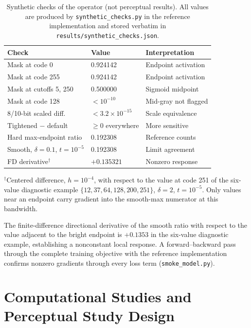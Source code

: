 \documentclass[5p,times,twocolumn]{elsarticle}
\begin{document}
\begin{table}[t]
\centering
\caption{Synthetic checks of the operator (not perceptual results). All
values are produced by \texttt{synthetic\_checks.py} in the reference
implementation and stored verbatim in
\texttt{results/synthetic\_checks.json}.}
\label{tab:checks}
\footnotesize
\setlength{\tabcolsep}{3pt}
\begin{tabular}{@{}lll@{}}
\toprule
Check & Value & Interpretation \\
\midrule
Mask at code 0 & 0.924142 & Endpoint activation \\
Mask at code 255 & 0.924142 & Endpoint activation \\
Mask at cutoffs 5, 250 & 0.500000 & Sigmoid midpoint \\
Mask at code 128 & $< 10^{-10}$ & Mid-gray not flagged \\
8/10-bit scaled diff. & $< 3.2 \times 10^{-15}$ & Scale equivalence \\
Tightened $-$ default & $\geq 0$ everywhere & More sensitive \\
Hard max-endpoint ratio & 0.192308 & Reference counts \\
Smooth, $\delta{=}0.1$, $t{=}10^{-5}$ & 0.192308 & Limit agreement \\
FD derivative$^{\dagger}$ & $+0.135321$ & Nonzero response \\
\bottomrule
\end{tabular}

\vspace{2pt}
{\footnotesize $^{\dagger}$Centered difference, $h = 10^{-4}$, with respect to
the value at code 251 of the six-value diagnostic example
$\{12, 37, 64, 128, 200, 251\}$, $\delta = 2$, $t = 10^{-5}$. Only values near
an endpoint carry gradient into the smooth-max numerator at this bandwidth.}
\end{table}

The finite-difference directional derivative of the smooth ratio with respect
to the value adjacent to the bright endpoint is $+0.1353$ in the six-value
diagnostic example, establishing a nonconstant local response. A
forward--backward pass through the complete training objective with the
reference implementation confirms nonzero gradients through every loss term
(\texttt{smoke\_model.py}).

\section{Computational Studies and Perceptual Study Design}
\label{sec:study}
\end{document}
